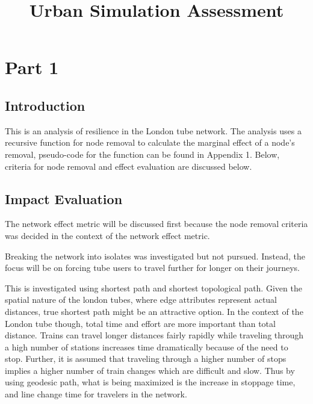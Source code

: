\documentclass[11pt]{article} %
\title{\vspace{-3.0cm}Urban Simulation Assessment}
\begin{document}
\maketitle


\section{Part 1}



\subsection{Introduction}

This is an analysis of resilience in the London tube network. The analysis uses a recursive function for node removal to calculate the marginal effect of a node's removal, pseudo-code for the function can be found in Appendix 1. Below, criteria for node removal and effect evaluation are discussed below. 


\subsection{Impact Evaluation}
The network effect metric will be discussed first because the node removal criteria was decided in the context of the network effect metric.

Breaking the network into isolates was investigated but not pursued. Instead, the focus will be on forcing tube users to travel further for longer on their journeys. 

This is investigated using shortest path and shortest topological path. Given the spatial nature of the london tubes, where edge attributes represent actual distances, true shortest path might be an attractive option. In the context of the London tube though, total time and effort are more important than total distance. Trains can travel longer distances fairly rapidly while traveling through a high number of stations increases time dramatically because of the need to stop. Further, it is assumed that traveling through a higher number of stops implies a higher number of train changes which are difficult and slow. Thus by using geodesic path, what is being maximized is the increase in stoppage time, and line change time for travelers in the network.
\end{document}
